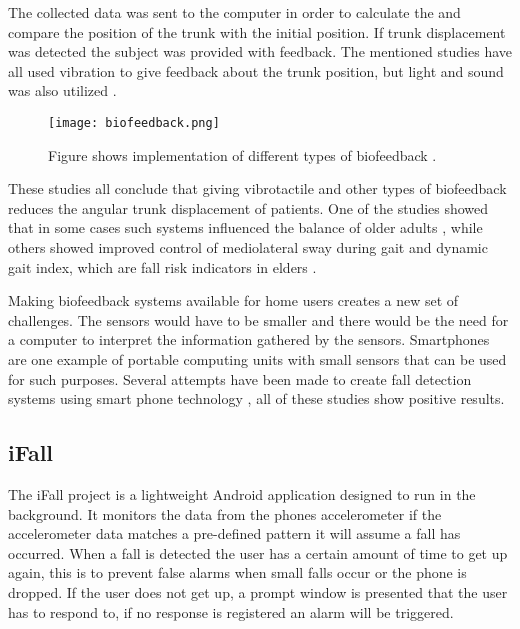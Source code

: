 The collected data was sent to the computer in order to calculate the and compare the position of the trunk with the initial position. If trunk displacement was detected the subject was provided with feedback. The mentioned studies have all used vibration to give feedback about the trunk position, but light and sound was also utilized \cite{multiModualBiofeedback}. 

\begin{figure}[h!]
  \centering
    \texttt{[image: biofeedback.png]}
    \caption{\footnotesize Figure shows implementation of different types of biofeedback \cite{multiModualBiofeedback}.}
\end{figure}

These studies all conclude that giving vibrotactile and other types of biofeedback reduces the angular trunk displacement of patients. One of the studies showed that in some cases such systems influenced the balance of older adults \cite{multiModualBiofeedback}, while others showed improved control of mediolateral sway during gait and dynamic gait index, which are fall risk indicators in elders \cite{vibrotactileTiltFeedback}.

Making biofeedback systems available for home users creates a new set of challenges. The sensors would have to be smaller and there would be the need for a computer to interpret the information gathered by the sensors. Smartphones are one example of portable computing units with small sensors that can be used for such purposes. Several attempts have been made to create fall detection systems using smart phone technology \cite{iFall, semiSupervisedFallDetection, mobilePhoneBasedFallDetection, detectionOfFalls}, all of these studies show positive results.

\subsection{iFall}
The iFall \cite{iFall} project is a lightweight Android application designed to run in the background. It monitors the data from the phones accelerometer if the accelerometer data matches a pre-defined pattern it will assume a fall has occurred. When a fall is detected the user has a certain amount of time to get up again, this is to prevent false alarms when small falls occur or the phone is dropped. If the user does not get up, a prompt window is presented that the user has to respond to, if no response is registered an alarm will be triggered. 

